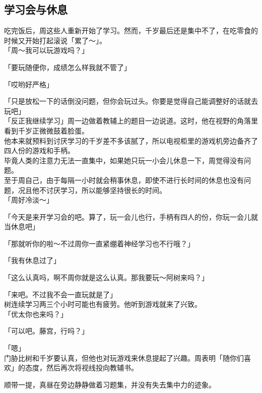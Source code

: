 \subsection{学习会与休息}

吃完饭后，周这些人重新开始了学习。然而，千岁最后还是集中不了，在吃零食的时候又开始打起滚说「累了～」。\\

「周～我可以玩游戏吗？」

「要玩随便你，成绩怎么样我就不管了」

「哎哟好严格」

「只是放松一下的话倒没问题，但你会玩过头。你要是觉得自己能调整好的话就去玩吧」\\

「反正我继续学习」周一边做着教辅上的题目一边说道。这时，他在视野的角落里看到千岁正微微鼓着脸蛋。\\

他本来就预料到讨厌学习的千岁差不多该腻了，所以电视柜里的游戏机旁边备齐了四人份的游戏和手柄。\\

毕竟人类的注意力无法一直集中，如果她只玩一小会儿休息一下，周觉得没有问题。\\

至于周自己，由于每隔一小时就会稍事休息，即使不进行长时间的休息也没有问题，况且他不讨厌学习，所以能够坚持很长的时间。\\

「周好冷淡～」

「今天是来开学习会的吧。算了，玩一会儿也行，手柄有四人的份，你玩一会儿就当休息吧」

「那就听你的啦～不过周你一直紧绷着神经学习也不行哦？」

「我有休息过了」

「这么认真吗，啊不周你就是这么认真。那我要玩～阿树来吗？」

「来吧。不过我不会一直玩就是了」\\

树连续学习两三个小时可能也有疲劳。他听到游戏就来了兴致。\\

「优太你也来吗？」

「可以吧。藤宫，行吗？」

「嗯」\\

门胁比树和千岁要认真，但他也对玩游戏来休息提起了兴趣。周表明「随你们喜欢」的态度，然后再次将视线投向教辅书。

顺带一提，真昼在旁边静静做着习题集，并没有失去集中力的迹象。\\


